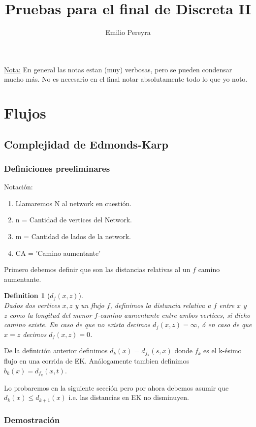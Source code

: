 \documentclass{article}
\title{Pruebas para el final de Discreta II}
\author{Emilio Pereyra}
\newtheorem{definition}{Definition}[section]
\begin{document}
\begin{titlepage}
	\maketitle
	\underline{Nota:} En general las notas estan (muy) verbosas, pero se pueden condensar mucho
	más. No es necesario en el final notar absolutamente todo lo que yo noto.
\end{titlepage}
\section{Flujos}
\subsection{Complejidad de Edmonds-Karp}
\subsubsection{Definiciones preeliminares}
Notación:
\begin{enumerate}
	\item Llamaremos N al network en cuestión.
	\item n = Cantidad de vertices del Network.
	\item m = Cantidad de lados de la network.
	\item	CA = 'Camino aumentante'
\end{enumerate}
Primero debemos definir que son las distancias relativas al un $f$ camino aumentante.

\begin{definition}[$d_{f}(x,z)$]\\
Dados dos vertices $x,z$ y un flujo $f$, definimos la distancia relativa a $f$ entre $x$ y $z$
como la longitud del menor $f$-camino aumentante entre ambos vertices, si dicho camino existe. En
caso de que no exista decimos $d_f(x,z) = \infty$, ó en caso de que $x=z$ decimos $d_f(x,z) = 0$.
\end{definition}
De la definición anterior definimos $d_k(x) = d_{f_k}(s,x)$ donde  $f_k$ es el k-ésimo flujo en
una corrida de EK. Análogamente tambien definimos $b_k(x) = d_{f_k}(x,t)$.

Lo probaremos en la siguiente sección pero por ahora debemos asumir que $d_k(x) \leq d_{k+1}(x)$
i.e. las distancias en EK no disminuyen.

\subsubsection{Demostración}
\end{document}
